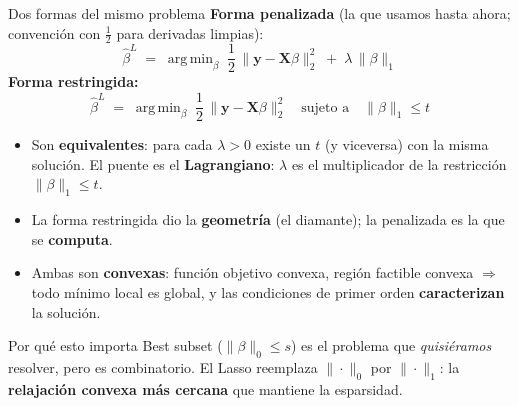 \documentclass{beamer}
\newcommand{\1}{\mathbb{I}}
\DeclareMathOperator*{\argmin}{arg\,min}
\begin{document}
\begin{frame}{Dos formas del mismo problema}
\small
\textbf{Forma penalizada} (la que usamos hasta ahora; convención con $\tfrac{1}{2}$ para derivadas limpias):
\[ \hat{\beta}^{L} \;=\; \argmin_{\beta} \; \frac{1}{2}\,\|\mathbf{y} - \mathbf{X}\beta\|_2^2 \;+\; \lambda\, \|\beta\|_1 \]
\pause
\textbf{Forma restringida:}
\[ \hat{\beta}^{L} \;=\; \argmin_{\beta} \; \frac{1}{2}\,\|\mathbf{y} - \mathbf{X}\beta\|_2^2 \quad \text{sujeto a} \quad \|\beta\|_1 \leq t \]
\pause

\begin{itemize}\itemsep4pt
  \item Son \textbf{equivalentes}: para cada $\lambda > 0$ existe un $t$ (y viceversa) con la misma solución. El puente es el \textbf{Lagrangiano}: $\lambda$ es el multiplicador de la restricción $\|\beta\|_1 \leq t$.
  \item La forma restringida dio la \textbf{geometría} (el diamante); la penalizada es la que se \textbf{computa}. \pause
  \item Ambas son \textbf{convexas}: función objetivo convexa, región factible convexa $\Rightarrow$ todo mínimo local es global, y las condiciones de primer orden \textbf{caracterizan} la solución.
\end{itemize}
\pause

\begin{block}{Por qué esto importa}
Best subset ($\|\beta\|_0 \leq s$) es el problema que \emph{quisiéramos} resolver, pero es combinatorio. El Lasso reemplaza $\|\cdot\|_0$ por $\|\cdot\|_1$: la \textbf{relajación convexa más cercana} que mantiene la esparsidad.
\end{block}
\end{frame}
\end{document}
